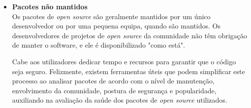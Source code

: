 \begin{itemize}
  \item \textbf{Pacotes não mantidos}\\
  Os pacotes de \textit{open source} são geralmente mantidos por um único desenvolvedor ou por uma pequena equipa, quando são mantidos. Os desenvolvedores de projetos de \textit{open source} da comunidade não têm obrigação de manter o software, e ele é disponibilizado "como está".
  \par \vspace{6pt}
  Cabe aos utilizadores dedicar tempo e recursos para garantir que o código seja seguro. Felizmente, existem ferramentas úteis que podem simplificar este processo ao analisar pacotes de acordo com o nível de manutenção, envolvimento da comunidade, postura de segurança e popularidade, auxiliando na avaliação da saúde dos pacotes de \textit{open source} utilizados. 
\end{itemize}